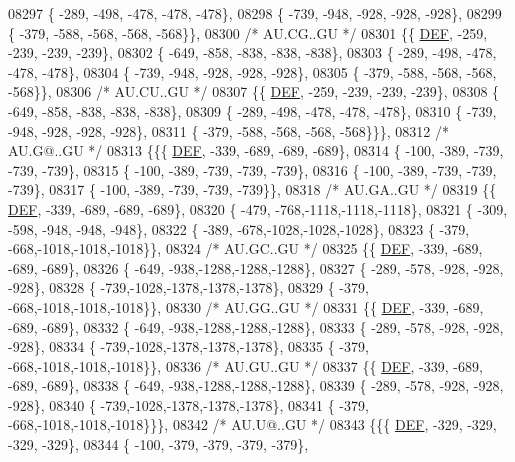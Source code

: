 \begin{DoxyCode}
08297 \{ -289, -498, -478, -478, -478\},
08298 \{ -739, -948, -928, -928, -928\},
08299 \{ -379, -588, -568, -568, -568\}\},
08300 \textcolor{comment}{/* AU.CG..GU */}
08301 \{\{  \mbox{\hyperlink{1_88_84__epars_8h_a397419fc12b37ed479c8abb9d444d843}{DEF}}, -259, -239, -239, -239\},
08302 \{ -649, -858, -838, -838, -838\},
08303 \{ -289, -498, -478, -478, -478\},
08304 \{ -739, -948, -928, -928, -928\},
08305 \{ -379, -588, -568, -568, -568\}\},
08306 \textcolor{comment}{/* AU.CU..GU */}
08307 \{\{  \mbox{\hyperlink{1_88_84__epars_8h_a397419fc12b37ed479c8abb9d444d843}{DEF}}, -259, -239, -239, -239\},
08308 \{ -649, -858, -838, -838, -838\},
08309 \{ -289, -498, -478, -478, -478\},
08310 \{ -739, -948, -928, -928, -928\},
08311 \{ -379, -588, -568, -568, -568\}\}\},
08312 \textcolor{comment}{/* AU.G@..GU */}
08313 \{\{\{  \mbox{\hyperlink{1_88_84__epars_8h_a397419fc12b37ed479c8abb9d444d843}{DEF}}, -339, -689, -689, -689\},
08314 \{ -100, -389, -739, -739, -739\},
08315 \{ -100, -389, -739, -739, -739\},
08316 \{ -100, -389, -739, -739, -739\},
08317 \{ -100, -389, -739, -739, -739\}\},
08318 \textcolor{comment}{/* AU.GA..GU */}
08319 \{\{  \mbox{\hyperlink{1_88_84__epars_8h_a397419fc12b37ed479c8abb9d444d843}{DEF}}, -339, -689, -689, -689\},
08320 \{ -479, -768,-1118,-1118,-1118\},
08321 \{ -309, -598, -948, -948, -948\},
08322 \{ -389, -678,-1028,-1028,-1028\},
08323 \{ -379, -668,-1018,-1018,-1018\}\},
08324 \textcolor{comment}{/* AU.GC..GU */}
08325 \{\{  \mbox{\hyperlink{1_88_84__epars_8h_a397419fc12b37ed479c8abb9d444d843}{DEF}}, -339, -689, -689, -689\},
08326 \{ -649, -938,-1288,-1288,-1288\},
08327 \{ -289, -578, -928, -928, -928\},
08328 \{ -739,-1028,-1378,-1378,-1378\},
08329 \{ -379, -668,-1018,-1018,-1018\}\},
08330 \textcolor{comment}{/* AU.GG..GU */}
08331 \{\{  \mbox{\hyperlink{1_88_84__epars_8h_a397419fc12b37ed479c8abb9d444d843}{DEF}}, -339, -689, -689, -689\},
08332 \{ -649, -938,-1288,-1288,-1288\},
08333 \{ -289, -578, -928, -928, -928\},
08334 \{ -739,-1028,-1378,-1378,-1378\},
08335 \{ -379, -668,-1018,-1018,-1018\}\},
08336 \textcolor{comment}{/* AU.GU..GU */}
08337 \{\{  \mbox{\hyperlink{1_88_84__epars_8h_a397419fc12b37ed479c8abb9d444d843}{DEF}}, -339, -689, -689, -689\},
08338 \{ -649, -938,-1288,-1288,-1288\},
08339 \{ -289, -578, -928, -928, -928\},
08340 \{ -739,-1028,-1378,-1378,-1378\},
08341 \{ -379, -668,-1018,-1018,-1018\}\}\},
08342 \textcolor{comment}{/* AU.U@..GU */}
08343 \{\{\{  \mbox{\hyperlink{1_88_84__epars_8h_a397419fc12b37ed479c8abb9d444d843}{DEF}}, -329, -329, -329, -329\},
08344 \{ -100, -379, -379, -379, -379\},

\end{DoxyCode}
